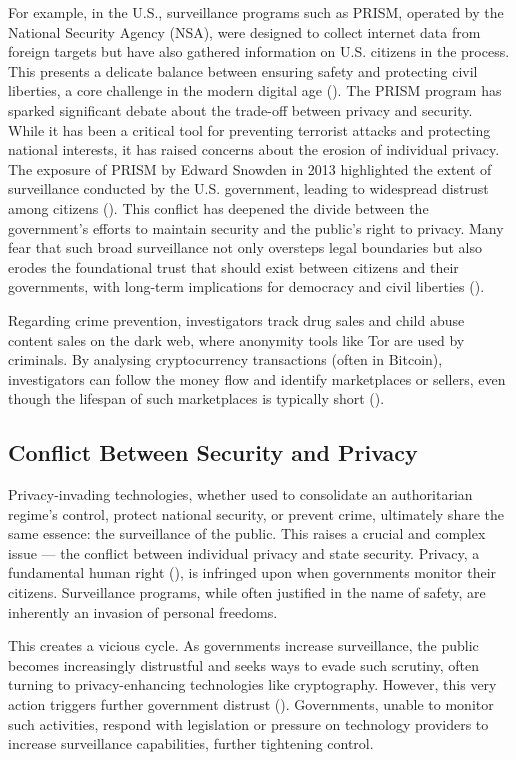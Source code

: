 \documentclass[a4paper,12pt]{article}
\begin{document}
For example, in the U.S., surveillance programs such as PRISM, operated by the National Security Agency (NSA), were designed to collect internet data from foreign targets but have also gathered information on U.S. citizens in the process. This presents a delicate balance between ensuring safety and protecting civil liberties, a core challenge in the modern digital age (\cite{greenwald2013nsa}). The PRISM program has sparked significant debate about the trade-off between privacy and security. While it has been a critical tool for preventing terrorist attacks and protecting national interests, it has raised concerns about the erosion of individual privacy. The exposure of PRISM by Edward Snowden in 2013 highlighted the extent of surveillance conducted by the U.S. government, leading to widespread distrust among citizens (\cite{florek2014prism}). This conflict has deepened the divide between the government’s efforts to maintain security and the public’s right to privacy. Many fear that such broad surveillance not only oversteps legal boundaries but also erodes the foundational trust that should exist between citizens and their governments, with long-term implications for democracy and civil liberties (\cite{jawaid2020privacy}).

Regarding crime prevention, investigators track drug sales and child abuse content sales on the dark web, where anonymity tools like Tor are used by criminals. By analysing cryptocurrency transactions (often in Bitcoin), investigators can follow the money flow and identify marketplaces or sellers, even though the lifespan of such marketplaces is typically short (\cite{horan2021cyber}).

\subsection{Conflict Between Security and Privacy}
Privacy-invading technologies, whether used to consolidate an authoritarian regime’s control, protect national security, or prevent crime, ultimately share the same essence: the surveillance of the public. This raises a crucial and complex issue — the conflict between individual privacy and state security. Privacy, a fundamental human right (\cite{diggelmann2014privacy}), is infringed upon when governments monitor their citizens. Surveillance programs, while often justified in the name of safety, are inherently an invasion of personal freedoms.

This creates a vicious cycle. As governments increase surveillance, the public becomes increasingly distrustful and seeks ways to evade such scrutiny, often turning to privacy-enhancing technologies like cryptography. However, this very action triggers further government distrust (\cite{jawaid2020privacy}). Governments, unable to monitor such activities, respond with legislation or pressure on technology providers to increase surveillance capabilities, further tightening control.
\end{document}
